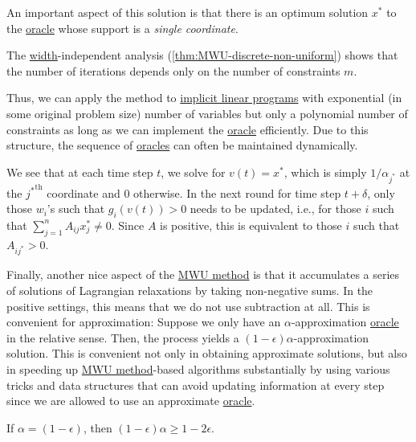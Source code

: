 An important aspect of this solution is that there is an optimum solution \(x^{\ast} \) to the \hyperref[eq:MWU-oracle-LP]{oracle} whose support is a \emph{single coordinate}.

\begin{prev}
	The \hyperref[def:width]{width}-independent analysis (\autoref{thm:MWU-discrete-non-uniform}) shows that the number of iterations depends only on the number of constraints \(m\).
\end{prev}

Thus, we can apply the method to \hyperref[def:implicit-LP]{implicit linear programs} with exponential (in some original problem size) number of variables but only a polynomial number of constraints as long as we can implement the \hyperref[eq:MWU-oracle-LP]{oracle} efficiently. Due to this structure, the sequence of \hyperref[eq:MWU-oracle-LP]{oracles} can often be maintained dynamically.

\begin{remark}
	We see that at each time step \(t\), we solve for \(v(t) = x^{\ast} \), which is simply \(1 / \alpha _{j^{\ast} }\) at the \({j^{\ast} }^{\text{th} }\) coordinate and \(0\) otherwise. In the next round for time step \(t + \delta \), only those \(w_i\)'s such that \(g_i(v(t)) > 0\) needs to be updated, i.e., for those \(i\) such that \(\sum_{j=1}^{n} A_{ij} x^{\ast} _j \neq 0\). Since \(A\) is positive, this is equivalent to those \(i\) such that \(A_{i j^{\ast} } > 0\).
\end{remark}


Finally, another nice aspect of the \hyperref[algo:MWU-discrete-non-uniform]{MWU method} is that it accumulates a series of solutions of Lagrangian relaxations by taking non-negative sums. In the positive settings, this means that we do not use subtraction at all. This is convenient for approximation: Suppose we only have an \(\alpha \)-approximation \hyperref[eq:MWU-oracle-LP]{oracle} in the relative sense. Then, the process yields a \((1 - \epsilon )\alpha \)-approximation solution. This is convenient not only in obtaining approximate solutions, but also in speeding up \hyperref[algo:MWU-discrete-non-uniform]{MWU method}-based algorithms substantially by using various tricks and data structures that can avoid updating information at every step since we are allowed to use an approximate \hyperref[eq:MWU-oracle-LP]{oracle}.

\begin{note}
	If \(\alpha = (1 - \epsilon )\), then \((1 - \epsilon ) \alpha \geq 1 - 2\epsilon \).
\end{note}

